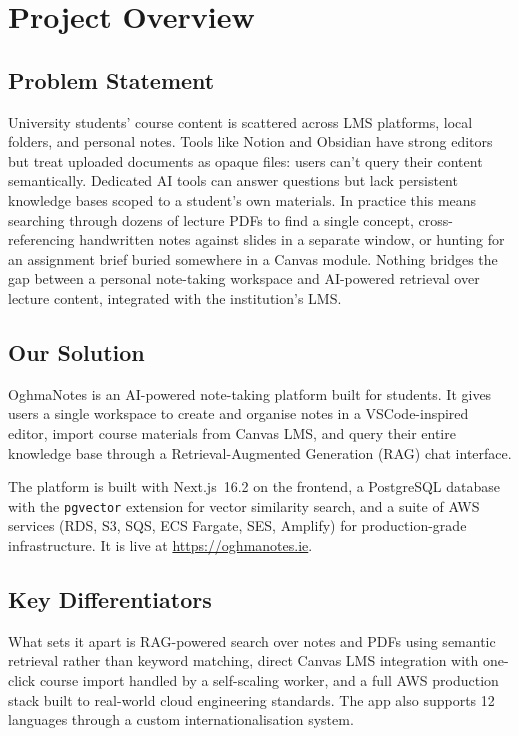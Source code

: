 \documentclass[12pt,a4paper]{article}
\newcommand{\tech}[1]{\texttt{#1}}
\begin{document}
\section{Project Overview}
\label{sec:overview}

\subsection{Problem Statement}

University students' course content is scattered across LMS platforms, local folders, and personal notes. Tools like Notion and Obsidian have strong editors but treat uploaded documents as opaque files: users can't query their content semantically. Dedicated AI tools can answer questions but lack persistent knowledge bases scoped to a student's own materials. In practice this means searching through dozens of lecture PDFs to find a single concept, cross-referencing handwritten notes against slides in a separate window, or hunting for an assignment brief buried somewhere in a Canvas module. Nothing bridges the gap between a personal note-taking workspace and AI-powered retrieval over lecture content, integrated with the institution's LMS.

\subsection{Our Solution}

OghmaNotes is an AI-powered note-taking platform built for students. It gives users a single workspace to create and organise notes in a VSCode-inspired editor, import course materials from Canvas LMS, and query their entire knowledge base through a Retrieval-Augmented Generation (RAG) chat interface.

The platform is built with Next.js~16.2 on the frontend, a PostgreSQL database with the \tech{pgvector} extension for vector similarity search, and a suite of AWS services (RDS, S3, SQS, ECS Fargate, SES, Amplify) for production-grade infrastructure. It is live at \url{https://oghmanotes.ie}.

\subsection{Key Differentiators}

What sets it apart is RAG-powered search over notes and PDFs using semantic retrieval rather than keyword matching, direct Canvas LMS integration with one-click course import handled by a self-scaling worker, and a full AWS production stack built to real-world cloud engineering standards. The app also supports 12 languages through a custom internationalisation system.
\end{document}
